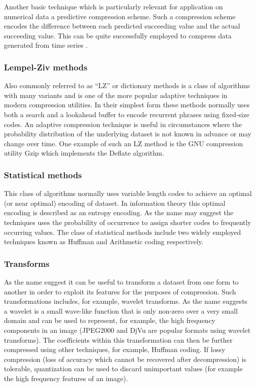 \documentclass{acm_proc_article-sp}
\begin{document}
Another basic technique which is particularly relevant for application on numerical data a predictive compression scheme. Such a compression scheme encodes the 
difference between each predicted succeeding value and the actual succeeding value. This can be quite successfully employed to compress data generated from time series \cite{engelson2000lossless}.
\subsubsection{Lempel-Ziv methods}
Also commonly referred to as “LZ” or dictionary methods is a class of algorithms with many variants and is one of the more popular adaptive techniques in modern 
compression utilities. In their simplest form these methods normally uses both a search and a lookahead buffer to encode recurrent phrases using fixed-size codes. An 
adaptive compression technique is useful in circumstances where the probability distribution of the underlying dataset is not known in advance or may change over time. 
One example of such an LZ method is the GNU compression utility Gzip which implements the Deflate algorithm.
\subsubsection{Statistical methods}
This class of algorithms normally uses variable length codes to achieve an optimal (or near optimal) encoding of dataset. In information theory this optimal encoding is 
described as an entropy encoding. As the name may suggest the techniques uses the probability of occurrence to assign shorter codes to frequently occurring values. The 
class of statistical methods include two widely employed techniques known as Huffman and Arithmetic coding respectively.
\subsubsection{Transforms}
As the name suggest it can be useful to transform a dataset from one form to another in order to exploit its features for the purposes of compression. Such transformations 
includes, for example, wavelet transforms. As the name suggests a wavelet is a small wave-like function that is only non-zero over a very small domain and can be used 
to represent, for example, the high frequency components in an image (JPEG2000 and DjVu are popular formats using wavelet transforms). The coefficients within this 
transformation can then be further compressed using other techniques, for example, Huffman coding. If lossy compression (loss of accuracy which cannot be recovered after 
decompression)  is tolerable, quantization can be used to discard unimportant values (for example the high frequency features of an image).
\end{document}
